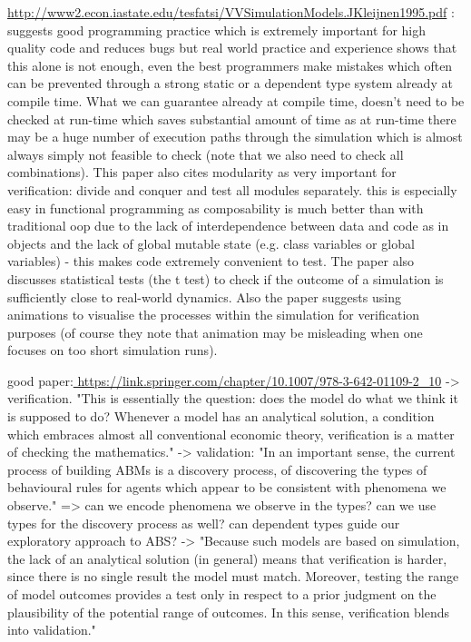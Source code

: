 \url{http://www2.econ.iastate.edu/tesfatsi/VVSimulationModels.JKleijnen1995.pdf} : suggests good programming practice which is extremely important for high quality code and reduces bugs but real world practice and experience shows that this alone is not enough, even the best programmers make mistakes which often can be prevented through a strong static or a dependent type system already at compile time. What we can guarantee already at compile time, doesn't need to be checked at run-time which saves substantial amount of time as at run-time there may be a huge number of execution paths through the simulation which is almost always simply not feasible to check (note that we also need to check all combinations). This paper also cites modularity as very important for verification: divide and conquer and test all modules separately. this is especially easy in functional programming as composability is much better than with traditional oop due to the lack of interdependence between data and code as in objects and the lack of global mutable state (e.g. class variables or global variables) - this makes code extremely convenient to test. The paper also discusses statistical tests (the t test) to check if the outcome of a simulation is sufficiently close to real-world dynamics. Also the paper suggests using animations to visualise the processes within the simulation for verification purposes (of course they note that animation may be misleading when one focuses on too short simulation runs).

good paper:\url{ https://link.springer.com/chapter/10.1007/978-3-642-01109-2_10}
	-> verification. "This is essentially the question: does the model do what we think it is supposed to do? Whenever a model has an analytical solution, a condition which embraces almost all conventional economic theory, verification is a matter of checking the mathematics."
	-> validation: "In an important sense, the current process of building ABMs is a discovery process, of discovering the types of behavioural rules for agents which appear to be consistent with phenomena we observe."
		=> can we encode phenomena we observe in the types? can we use types for the discovery process as well? can dependent types guide our exploratory approach to ABS?
	-> "Because such models are based on simulation, the lack of an analytical solution (in
general) means that verification is harder, since there is no single result the model
must match. Moreover, testing the range of model outcomes provides a test only in
respect to a prior judgment on the plausibility of the potential range of outcomes.
In this sense, verification blends into validation."

